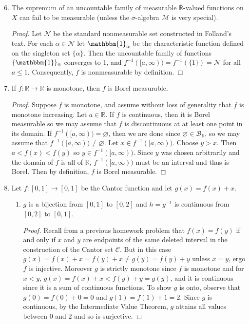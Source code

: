 \documentclass[11pt,oneside,english]{amsart}
\theoremstyle{definition}
\newcommand{\R}{\mathbb{R}}
\newcommand{\MC}[1]{\mathcal{#1}}
\begin{document}
\begin{enumerate}
\setcounter{enumi}{5}
\item The supremum of an uncountable family of measurable $\overline{\R}$-valued functions on $X$ can fail to be measurable (unless the $\sigma$-algebra $\MC{M}$ is very special).

\begin{proof}
Let $\MC{N}$ be the standard nonmeasurable set constructed in Folland's text. For each $\alpha\in \MC{N}$ let $\mathbbm{1}_\alpha$ be the characteristic function defined on the singleton set $\{\alpha\}$. Then the uncountable family of functions $\{\mathbbm{1}\}_\alpha$ converges to 1, and $f^{-1}([a,\infty))=f^{-1}(\{1\})=\MC{N}$ for all $a\leq1$. Consequently, $f$ is nonmeasurable by definition.
\end{proof}

\setcounter{enumi}{7}
\item If $f:\R\rightarrow\R$ is monotone, then $f$ is Borel measurable.

\begin{proof}
Suppose $f$ is monotone, and assume without loss of generality that $f$ is monotone increasing. Let $a\in\R$. If $f$ is continuous, then it is Borel measurable so we may assume that $f$ is discontinuous at at least one point in its domain. If $f^{-1}([a,\infty))=\varnothing$, then we are done since $\varnothing\in\MC{B}_\R$, so we may assume that $f^{-1}([a,\infty))\neq\varnothing$. Let $x\in f^{-1}([a,\infty))$. Choose $y>x$. Then $a<f(x)<f(y)$ so $y\in f^{-1}([a,\infty))$. Since $y$ was chosen arbitrarily and the domain of $f$ is all of $\R$, $f^{-1}([a,\infty))$ must be an interval and thus is Borel. Then by definition, $f$ is Borel measurable.
\end{proof}

\item Let $f:[0,1]\rightarrow[0,1]$ be the Cantor function and let $g(x)=f(x)+x$.

\begin{enumerate}
\item $g$ is a bijection from $[0,1]$ to $[0,2]$ and $h=g^{-1}$ is continuous from $[0,2]$ to $[0,1]$.

\begin{proof}
Recall from a previous homework problem that $f(x)=f(y)$ if and only if $x$ and $y$ are endpoints of the same deleted interval in the construction of the Cantor set $\MC{C}$. But in this case $g(x)=f(x)+x=f(y)+x\neq g(y)=f(y)+y$ unless $x=y$, ergo $f$ is injective. Moreover $g$ is strictly monotone since $f$ is monotone and for $x<y$, $g(x)=f(x)+x<f(y)+y=g(y)$, and it is continuous since it is a sum of continuous functions. To show $g$ is onto, observe that $g(0)=f(0)+0=0$ and $g(1)=f(1)+1=2$. Since $g$ is continuous, by the Intermediate Value Theorem, $g$ attains all values between $0$ and $2$ and so is surjective.


\end{proof}
\end{enumerate}
\end{enumerate}
\end{document}
